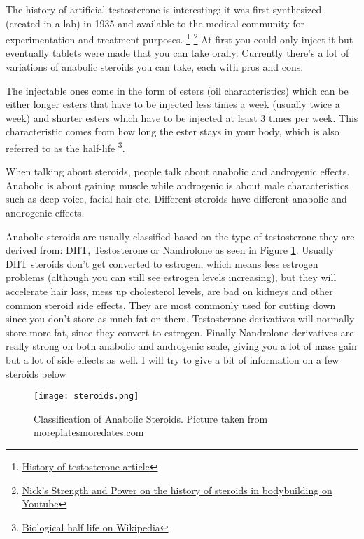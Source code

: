 \documentclass[openany, 12pt]{book}
\begin{document}
        The history of artificial testosterone is interesting: it was first synthesized (created in a lab) in 1935 and available to the medical community for experimentation and
        treatment purposes.
        \footnote{\href{http://denverhormonehealth.com/history-of-testosterone-new/}{History of testosterone article}}
        \footnote{\href{https://www.youtube.com/watch?v=C88Cn9e1UGM}{Nick's Strength and Power on the history of steroids in bodybuilding on Youtube}}
        At first you could only inject it but eventually tablets were made that you can take orally. Currently there's a lot of variations of anabolic steroids you can take, each with pros and cons.

        The injectable ones come in the form of esters (oil characteristics) which can be either longer esters that have to be injected less times a week (usually twice a week) and shorter esters which have
        to be injected at least 3 times per week. This characteristic comes from how long the ester stays in your body, which is also referred to as the half-life
        \footnote{\href{https://en.wikipedia.org/wiki/Biological_half-life}{Biological half life on Wikipedia}}.
        
        When talking about steroids, people talk about anabolic and androgenic effects. Anabolic is about gaining muscle while androgenic is about male characteristics such as deep voice, facial hair etc.
        Different steroids have different anabolic and androgenic effects.

        Anabolic steroids are usually classified based on the type of testosterone they are derived from: DHT, Testosterone or Nandrolone as seen in Figure \ref{fig9}.
        Usually DHT steroids don't get converted to estrogen, which means less estrogen problems (although you can still see estrogen levels increasing), but they will accelerate hair loss,
        mess up cholesterol levels, are bad on kidneys and other common steroid side effects. They are most commonly used for cutting down since you don't store as much fat on them.
        Testosterone derivatives will normally store more fat, since they convert to estrogen. Finally Nandrolone derivatives are really strong on both anabolic and androgenic scale, giving you a lot of
        mass gain but a lot of side effects as well.
        I will try to give a bit of information on a few steroids below

	\begin{figure}[h]
		\centering
		\texttt{[image: steroids.png]}
		\caption{Classification of Anabolic Steroids. Picture taken from moreplatesmoredates.com}
		\label{fig9}
	\end{figure}
\end{document}
